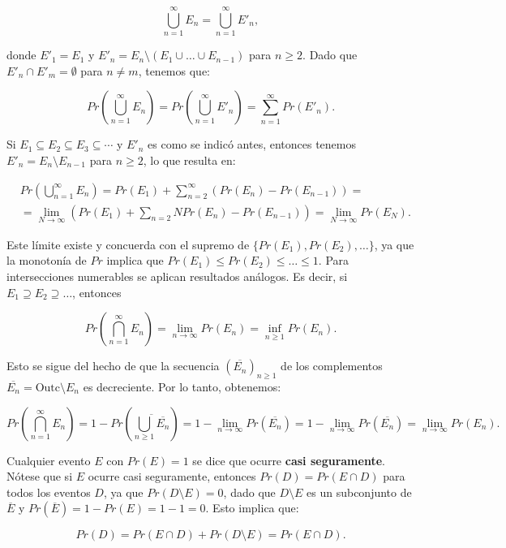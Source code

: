 \[
	\bigcup_{n=1}^{\infty} E_n = \bigcup_{n=1}^{\infty} E'_n,
\]

donde \(E'_1 = E_1\) y \(E'_n = E_n \setminus (E_1 \cup \ldots \cup E_{n-1})\)
para \(n \geq 2\). Dado que \(E'_n \cap E'_m = \emptyset\) para \(n \neq m\),
tenemos que:

\[
	Pr\left( \bigcup_{n=1}^{\infty} E_n \right) = Pr\left( \bigcup_{n=1}^{\infty} E'_n \right) = \sum_{n=1}^{\infty} Pr(E'_n).
\]

Si \(E_1 \subseteq E_2 \subseteq E_3 \subseteq \cdots\) y \(E'_n\) es como se
indicó antes, entonces tenemos \(E'_n = E_n \setminus E_{n-1}\) para \(n \geq
2\), lo que resulta en:

\begin{align*}
	&Pr\left( \bigcup_{n=1}^{\infty} E_n \right) = Pr(E_1) + \sum_{n=2}^{\infty} (Pr(E_n) - Pr(E_{n-1})) = \\ &= \lim_{N \to \infty} \left( Pr(E_1) + \sum_{n=2}{N} Pr(E_n) - Pr(E_{n-1})\right) =\lim_{N \to \infty} Pr(E_N).
\end{align*}

Este límite existe y concuerda con el supremo de \(\{Pr(E_1), Pr(E_2), \dots
\}\), ya que la monotonía de \(Pr\) implica que \(Pr(E_1) \leq Pr(E_2) \leq
\dots \leq 1\). Para intersecciones numerables se aplican resultados análogos.
Es decir, si \(E_1 \supseteq E_2 \supseteq \dots\), entonces

\[
	Pr\left( \bigcap_{n=1}^{\infty} E_n \right) = \lim_{n \to \infty} Pr(E_n) = \inf_{n \geq 1} Pr(E_n).
\]

Esto se sigue del hecho de que la secuencia \((\overline{E_n})_{n \geq 1}\) de
los complementos \(\overline{E_n} = \text{Outc} \setminus E_n\) es decreciente.
Por lo tanto, obtenemos:

\[
	Pr\left( \bigcap_{n=1}^{\infty} E_n \right) = 1 - Pr(\overline{\bigcup_{n \geq 1} \overline{E_n}}) = 1 - \lim_{n \to \infty} Pr(\overline{E_n}) = 1 - \lim_{n \to \infty} Pr(\overline{E_n}) = \lim_{n \to \infty} Pr(E_n).
\]

Cualquier evento \(E\) con \(Pr(E) = 1\) se dice que ocurre \textbf{casi
	seguramente}. Nótese que si \(E\) ocurre casi seguramente, entonces \(Pr(D) =
Pr(E \cap D)\) para todos los eventos \(D\), ya que \(Pr(D \setminus E) = 0\),
dado que \(D \setminus E\) es un subconjunto de \(\overline{E}\) y
\(Pr(\overline{E}) = 1 - Pr(E) = 1 - 1 = 0\). Esto implica que:

\[
	Pr(D) = Pr(E \cap D) + Pr(D \setminus E) = Pr(E \cap D).
\]

